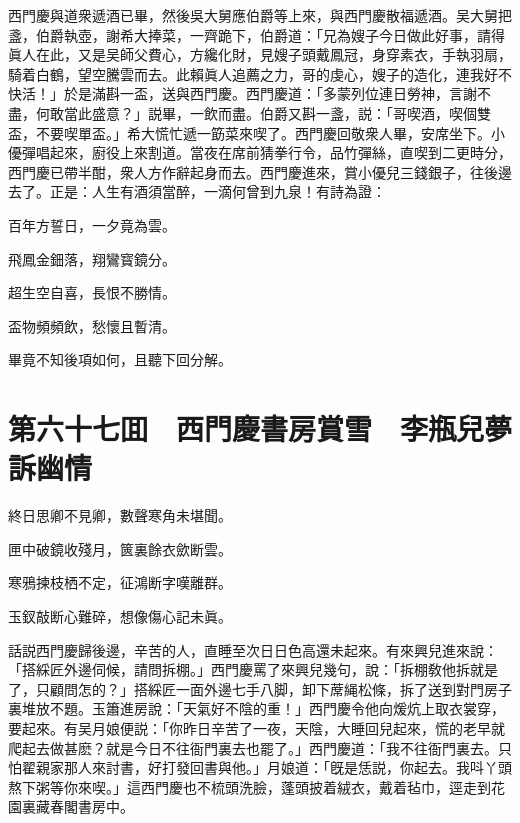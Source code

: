 西門慶與道衆遞酒已畢，然後吳大舅應伯爵等上來，與西門慶散福遞酒。吴大舅把盞，伯爵執壺，謝希大捧菜，一齊跪下，伯爵道：「兄為嫂子今日做此好事，請得眞人在此，又是吴師父費心，方纔化財，見嫂子頭戴鳳冠，身穿素衣，手執羽扇，騎着白鶴，望空騰雲而去。此賴眞人追薦之力，哥的虔心，嫂子的造化，連我好不快活！」於是滿斟一盃，送與西門慶。西門慶道：「多蒙列位連日勞神，言謝不盡，何敢當此盛意？」説畢，一飲而盡。伯爵又斟一盞，説：「哥喫酒，喫個雙盃，不要喫單盃。」希大慌忙遞一筯菜來喫了。西門慶回敬衆人畢，安席坐下。小優彈唱起來，廚役上來割道。當夜在席前猜拳行令，品竹彈絲，直喫到二更時分，西門慶已帶半酣，衆人方作辭起身而去。西門慶進來，賞小優兒三錢銀子，往後邊去了。正是：人生有酒須當醉，一滴何曾到九泉！有詩為證：

百年方誓日，一夕竟為雲。

飛鳳金鈿落，翔鸞寳鏡分。

超生空自喜，長恨不勝情。

盃物頻頻飲，愁懷且暫清。

畢竟不知後項如何，且聽下回分解。

\chapter*{第六十七囬　西門慶書房賞雪　李瓶兒夢訴幽情}

終日思卿不見卿，數聲寒角未堪聞。

匣中破鏡收殘月，篋裏餘衣歛断雲。

寒鴉揀枝栖不定，征鴻断字嘆離群。

玉釵敲断心難碎，想像傷心記未眞。

話説西門慶歸後邊，辛苦的人，直睡至次日日色高還未起來。有來興兒進來說：「搭綵匠外邊伺候，請問拆棚。」西門慶罵了來興兒幾句，說：「拆棚敎他拆就是了，只顧問怎的？」搭綵匠一面外邊七手八脚，卸下蓆䋲松條，拆了送到對門房子裏堆放不題。玉簫進房說：「天氣好不陰的重！」西門慶令他向煖炕上取衣裳穿，要起來。有吴月娘便説：「你昨日辛苦了一夜，天陰，大睡回兒起來，慌的老早就爬起去做甚麽？就是今日不往衙門裏去也罷了。」西門慶道：「我不往衙門裏去。只怕翟親家那人來討書，好打發回書與他。」月娘道：「旣是恁説，你起去。我呌丫頭熬下粥等你來喫。」這西門慶也不梳頭洗臉，蓬頭披着絨衣，戴着毡巾，逕走到花園裏藏春閣書房中。

